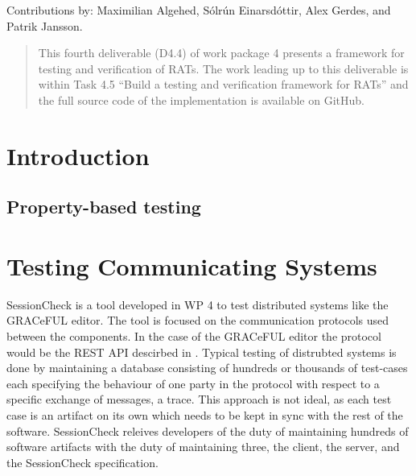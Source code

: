 \documentclass{article}
\begin{document}
Contributions by: Maximilian Algehed, Sólrún Einarsdóttir, Alex
Gerdes, and Patrik Jansson.

\begin{abstract}

This fourth deliverable (D4.4) of work package 4 presents a framework for
testing and verification of RATs.
%
The work leading up to this deliverable is within Task 4.5 ``Build a
testing and verification framework for RATs'' and the full source code
of the implementation is available on GitHub.


\end{abstract}

\vfill

\setcounter{tocdepth}{2}
\tableofcontents

\vfill


\newpage

\section{Introduction}



\subsection{Property-based testing}


\section{}

\section{Testing Communicating Systems}
%
SessionCheck \cite{SessionCheck} is a tool developed in WP 4 to test distributed systems like
the GRACeFUL editor.
%
The tool is focused on the communication protocols used between the components.
%
In the case of the GRACeFUL editor the protocol would be the REST API descirbed in \cite{D4.3}. 
%
Typical testing of distrubted systems is done by maintaining a database consisting of hundreds
or thousands of test-cases each specifying the behaviour of one party in the protocol with
respect to a specific exchange of messages, a trace.
%
This approach is not ideal, as each test case is an artifact on its own which needs to be kept
in sync with the rest of the software.
%
SessionCheck releives developers of the duty of maintaining hundreds of software artifacts with
the duty of maintaining three, the client, the server, and the SessionCheck specification.
\end{document}
